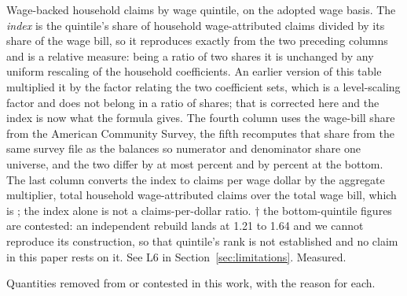 \documentclass[11pt]{article}
\theoremstyle{definition}
\begin{document}
\begin{table}[htbp]
\centering
\caption{Wage-backed household claims by wage quintile, on the adopted wage basis. The
\emph{index} is the quintile's share of household wage-attributed claims divided by its share of
the wage bill, so it reproduces exactly from the two preceding columns and is a relative measure:
being a ratio of two shares it is unchanged by any uniform rescaling of the household
coefficients. An earlier version of this table multiplied it by the factor relating the two
coefficient sets, which is a level-scaling factor and does not belong in a ratio of shares; that
is corrected here and the index is now what the formula gives. The fourth column uses the
wage-bill share from the American Community Survey, the fifth recomputes that share from the
same survey file as the balances so numerator and denominator share one universe, and the two
differ by at most  percent and by  percent at the
bottom. The last column converts the index to claims per wage dollar by the aggregate multiplier,
total household wage-attributed claims over the total wage bill, which is ;
the index alone is not a claims-per-dollar ratio. $\dagger$ the bottom-quintile figures are
contested: an independent rebuild lands at 1.21 to 1.64 and we cannot reproduce its construction,
so that quintile's rank is not established and no claim in this paper rests on it. See L6 in
Section~\ref{sec:limitations}. Measured.}
\label{tab:quintile}

\end{table}

\begin{table}[htbp]
\centering
\caption{Quantities removed from or contested in this work, with the reason for each.}
\label{tab:removed}

\end{table}



\end{document}
